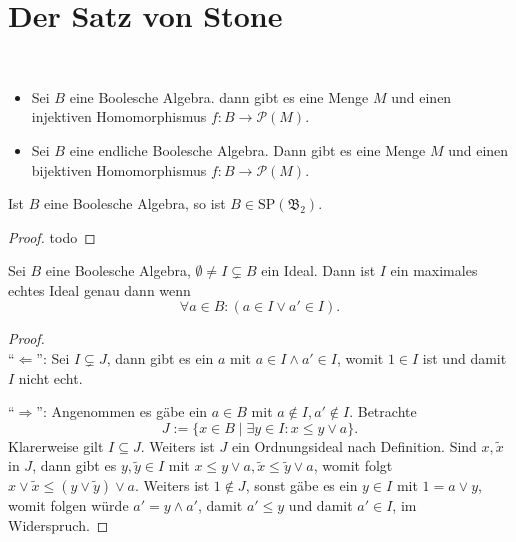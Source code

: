 \section{Der Satz von Stone}

\begin{theorem}{\ }
    \begin{itemize}
        \item Sei $B$ eine Boolesche Algebra. dann gibt es eine Menge $M$ und einen injektiven Homomorphismus $f : B \to \mathcal{P}(M)$.
        \item Sei $B$ eine endliche Boolesche Algebra. Dann gibt es eine Menge $M$ und einen bijektiven Homomorphismus $f : B \to \mathcal{P}(M)$.
    \end{itemize}
\end{theorem}

\begin{corollary}
    Ist $B$ eine Boolesche Algebra, so ist $B \in \mathrm{SP}(\mathfrak{B}_2)$.
\end{corollary}

\begin{proof}
    todo
\end{proof}

\begin{lemma}
    Sei $B$ eine Boolesche Algebra, $\emptyset \neq I \subsetneq B$ ein Ideal. Dann ist $I$ ein maximales echtes Ideal genau dann wenn
    $$ \forall a \in B : (a \in I \lor a' \in I). $$
\end{lemma}

\begin{proof}{\ } \\
    ``$\Leftarrow$'': Sei $I \subsetneq J$, dann gibt es ein $a$ mit $a \in I \land a' \in I$, womit $1 \in I$ ist und damit $I$ nicht echt.

    ``$\Rightarrow$'': Angenommen es gäbe ein $a \in B$ mit $a \notin I, a' \notin I$. Betrachte
    $$ J := \{ x \in B \mid \exists y \in I: x \leq y \lor a \}. $$
    Klarerweise gilt $I \subseteq J$. Weiters ist $J$ ein Ordnungsideal nach Definition. Sind $x, \widetilde{x}$ in $J$, dann gibt es $y, \widetilde{y} \in I$ mit $x \leq y \lor a, \widetilde{x} \leq \widetilde{y} \lor a$, womit folgt $x \lor \widetilde{x} \leq (y \lor \widetilde{y}) \lor a$. Weiters ist $1 \notin J$, sonst gäbe es ein $y \in I$ mit $1 = a \lor y$, womit folgen würde $a' = y \land a'$, damit $a' \leq y$ und damit $a' \in I$, im Widerspruch.
\end{proof}

